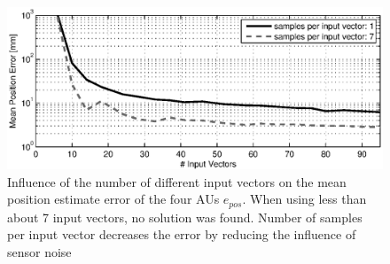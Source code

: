 \begin{figure}[hbtp]
\captionsetup{width=0.9\textwidth}
\centering
\includegraphics[width = \textwidth]{images/results/input_length_vs_position_error.eps}
\caption{Influence of the number of different input vectors on the mean position estimate error of the four AUs $e_{pos}$.
When using less than about 7 input vectors, no solution was found.
Number of samples per input vector decreases the error by reducing the influence of sensor noise}
\label{fig:result_inputlength}
\end{figure}

